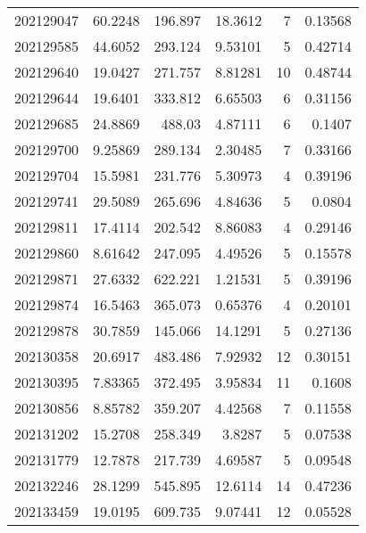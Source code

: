 \begin{tabular}{rrrrrr}
 202129047 &         60.2248  &      196.897  &           18.3612  &           7 & 0.13568 \\
 202129585 &         44.6052  &      293.124  &            9.53101 &           5 & 0.42714 \\
 202129640 &         19.0427  &      271.757  &            8.81281 &          10 & 0.48744 \\
 202129644 &         19.6401  &      333.812  &            6.65503 &           6 & 0.31156 \\
 202129685 &         24.8869  &      488.03   &            4.87111 &           6 & 0.1407  \\
 202129700 &          9.25869 &      289.134  &            2.30485 &           7 & 0.33166 \\
 202129704 &         15.5981  &      231.776  &            5.30973 &           4 & 0.39196 \\
 202129741 &         29.5089  &      265.696  &            4.84636 &           5 & 0.0804  \\
 202129811 &         17.4114  &      202.542  &            8.86083 &           4 & 0.29146 \\
 202129860 &          8.61642 &      247.095  &            4.49526 &           5 & 0.15578 \\
 202129871 &         27.6332  &      622.221  &            1.21531 &           5 & 0.39196 \\
 202129874 &         16.5463  &      365.073  &            0.65376 &           4 & 0.20101 \\
 202129878 &         30.7859  &      145.066  &           14.1291  &           5 & 0.27136 \\
 202130358 &         20.6917  &      483.486  &            7.92932 &          12 & 0.30151 \\
 202130395 &          7.83365 &      372.495  &            3.95834 &          11 & 0.1608  \\
 202130856 &          8.85782 &      359.207  &            4.42568 &           7 & 0.11558 \\
 202131202 &         15.2708  &      258.349  &            3.8287  &           5 & 0.07538 \\
 202131779 &         12.7878  &      217.739  &            4.69587 &           5 & 0.09548 \\
 202132246 &         28.1299  &      545.895  &           12.6114  &          14 & 0.47236 \\
 202133459 &         19.0195  &      609.735  &            9.07441 &          12 & 0.05528 \\

\end{tabular}
